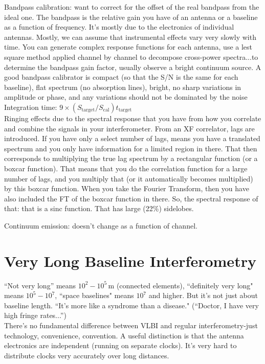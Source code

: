 \documentclass[a4paper]{article}
\begin{document}
Bandpass calibration: want to correct for the offset of the real bandpass from the ideal one. The bandpass is the relative gain you have of an antenna or a baseline as a function of frequency. It's mostly due to the electronics of individual antennas. Mostly, we can assume that instrumental effects vary very slowly with time. You can generate complex response functions for each antenna, use a lest square method applied channel by channel to decompose cross-power spectra...to determine the bandpass gain factor, usually observe a bright continuum source. A good bandpass calibrator is compact (so that the S/N is the same for each baseline), flat spectrum (no absorption lines), bright, no sharp variations in amplitude or phase, and any variations should not be dominated by the noise \\

Integration time: $ 9 \times (S_\mathrm{target} / S_\mathrm{cal}) t_\mathrm{target} $ \\

Ringing effects due to the spectral response that you have from how you correlate and combine the signals in your interferometer. From an XF correlator, lags are introduced. If you have only a select number of lags, means you have a translated spectrum and you only have information for a limited region in there. That then corresponds to multiplying the true lag spectrum by a rectangular function (or a boxcar function). That means that you do the correlation function for a large number of lags, and you multiply that (or it automatically becomes multiplied) by this boxcar function. When you take the Fourier Transform, then you have also included the FT of the boxcar function in there. So, the spectral response of that: that is a sinc function. That has large (22\%) sidelobes. 

Continuum emission: doesn't change as a function of channel. 

\section{Very Long Baseline Interferometry}

``Not very long'' means $10^2-10^5\,$m (connected elements), ``definitely very long" means $10^5-10^7$, ``space baselines" means $10^7$ and higher. But it's not just about baseline length. ``It's more like a syndrome than a disease." (``Doctor, I have very high fringe rates...'') \\

There's no fundamental difference between VLBI and regular interferometry-just technology, convenience, convention. A useful distinction is that the antenna electronics are independent (running on separate clocks). It's very hard to distribute clocks very accurately over long distances. \\
\end{document}
